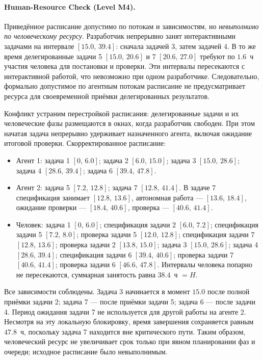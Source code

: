 \documentclass[12pt,a4paper]{article}
\theoremstyle{definition}
\begin{document}
\paragraph{Human-Resource Check (Level M4).}
Приведённое расписание допустимо по потокам и зависимостям, но \emph{невыполнимо по человеческому ресурсу}. Разработчик непрерывно занят интерактивными задачами на интервале $[15.0,\,39.4]$: сначала задачей 3, затем задачей 4. В то же время делегированные задачи 5 $[15.0,\,20.6]$ и 7 $[20.6,\,27.0]$ требуют по $1.6$~ч участия человека для постановки и проверки. Эти интервалы пересекаются с интерактивной работой, что невозможно при одном разработчике. Следовательно, формально допустимое по агентным потокам расписание не предусматривает ресурса для своевременной приёмки делегированных результатов.

Конфликт устраним перестройкой расписания: делегированные задачи и их человеческие фазы размещаются в окнах, когда разработчик свободен. При этом начатая задача непрерывно удерживает назначенного агента, включая ожидание итоговой проверки. Скорректированное расписание:
\begin{itemize}
  \item Агент 1: задача 1 $[0,\,6.0]$; задача 2 $[6.0,\,15.0]$; задача 3 $[15.0,\,28.6]$; задача 4 $[28.6,\,39.4]$; задача 6 $[39.4,\,47.8]$.
  \item Агент 2: задача 5 $[7.2,\,12.8]$; задача 7 $[12.8,\,41.4]$.
  В задаче 7 спецификация занимает $[12.8,\,13.6]$, автономная работа ---
  $[13.6,\,18.4]$, ожидание проверки --- $[18.4,\,40.6]$, проверка ---
  $[40.6,\,41.4]$.
  \item Человек: задача 1 $[0,\,6.0]$; спецификация задачи 2 $[6.0,\,7.2]$; спецификация задачи 5 $[7.2,\,8.0]$; проверка задачи 5 $[12.0,\,12.8]$; спецификация задачи 7 $[12.8,\,13.6]$; проверка задачи 2 $[13.8,\,15.0]$; задача 3 $[15.0,\,28.6]$; задача 4 $[28.6,\,39.4]$; спецификация задачи 6 $[39.4,\,40.6]$; проверка задачи 7 $[40.6,\,41.4]$; проверка задачи 6 $[46.6,\,47.8]$. Интервалы человека попарно не пересекаются, суммарная занятость равна $38.4$~ч $= H$.
\end{itemize}
Все зависимости соблюдены. Задача 3 начинается в момент $15.0$ после полной приёмки задачи 2; задача 7 --- после приёмки задачи 5; задача 6 --- после задачи 4. Период ожидания задачи 7 не используется для другой работы на агенте 2. Несмотря на эту локальную блокировку, время завершения сохраняется равным $47.8$~ч, поскольку задача 7 находится вне критического пути. Таким образом, человеческий ресурс не увеличивает срок только при явном планировании фаз и очереди; исходное расписание было невыполнимым.
\end{document}

